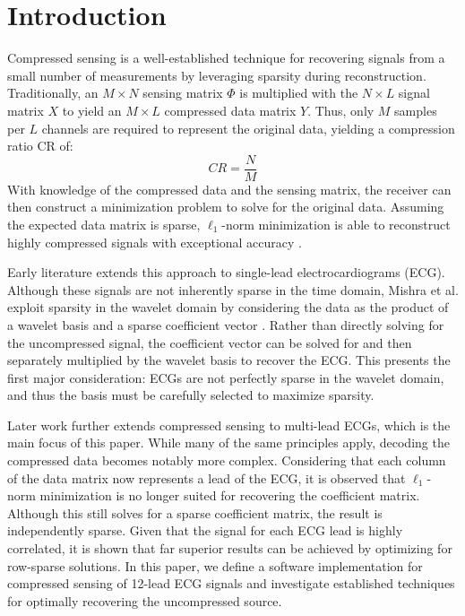 \section{Introduction}

Compressed sensing is a well-established technique for recovering signals from a small number of measurements by leveraging sparsity during reconstruction.
Traditionally, an \(M \times N\) sensing matrix \(\Phi\) is multiplied with the \(N \times L\) signal matrix \(X\) to yield an \(M \times L\) compressed data matrix \(Y\).
Thus, only \(M\) samples per \(L\) channels are required to represent the original data, yielding a compression ratio CR of:
\[ CR = \frac{N}{M} \]
With knowledge of the compressed data and the sensing matrix, the receiver can then construct a minimization problem to solve for the original data.
Assuming the expected data matrix is sparse, \(\ell_1\)-norm minimization is able to reconstruct highly compressed signals with exceptional accuracy \citep{donoho2006}.
\newline
\par
Early literature extends this approach to single-lead electrocardiograms (ECG). Although these signals are not inherently sparse in the time domain, Mishra et al. exploit sparsity in the wavelet domain by considering the data as the product of a wavelet basis and a sparse coefficient vector \citep{mishra2012}.
Rather than directly solving for the uncompressed signal, the coefficient vector can be solved for and then separately multiplied by the wavelet basis to recover the ECG.
This presents the first major consideration: ECGs are not perfectly sparse in the wavelet domain, and thus the basis must be carefully selected to maximize sparsity.
\newline
\par
Later work further extends compressed sensing to multi-lead ECGs, which is the main focus of this paper.
While many of the same principles apply, decoding the compressed data becomes notably more complex.
Considering that each column of the data matrix now represents a lead of the ECG, it is observed that \(\ell_1\)-norm minimization is no longer suited for recovering the coefficient matrix.
Although this still solves for a sparse coefficient matrix, the result is independently sparse.
Given that the signal for each ECG lead is highly correlated, it is shown that far superior results can be achieved by optimizing for row-sparse solutions.
In this paper, we define a software implementation for compressed sensing of 12-lead ECG signals and investigate established techniques for optimally recovering the uncompressed source.
